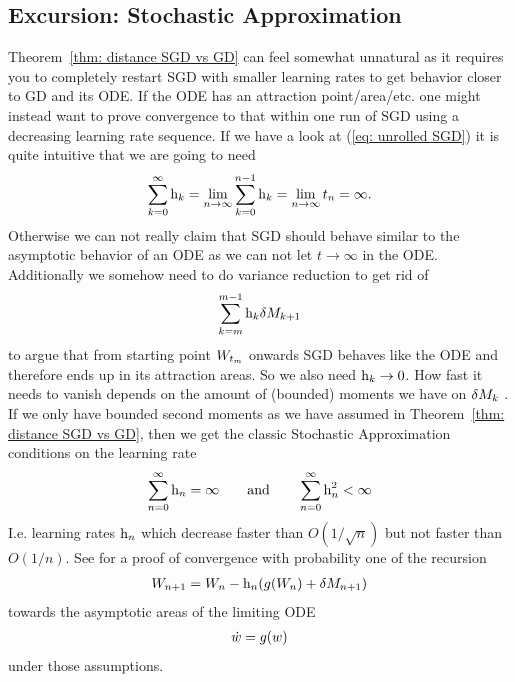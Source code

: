 \subsection{Excursion: Stochastic Approximation}

Theorem~\ref{thm: distance SGD vs GD} can feel somewhat unnatural as it requires
you to completely restart SGD with smaller learning rates to get behavior closer
to GD and its ODE. If the ODE has an attraction point/area/etc. one might
instead want to prove convergence to that within one run of SGD using a
decreasing learning rate sequence. If we have a look at (\ref{eq: unrolled SGD})
it is quite intuitive that we are going to need
\begin{align*}
	\sum_{k=0}^\infty \text{h}_k = \lim_{n\to\infty}\sum_{k=0}^{n-1} \text{h}_k
	= \lim_{n\to\infty}t_n = \infty.
\end{align*}
Otherwise we can not really claim that SGD should behave similar to the asymptotic
behavior of an ODE as we can not let \(t\to\infty\) in the ODE. Additionally
we somehow need to do variance reduction to get rid of
\begin{align*}
	\sum_{k=m}^{m-1} \text{h}_k\delta M_{k+1}
\end{align*}
to argue that from starting point \(W_{t_m}\) onwards SGD behaves like the ODE
and therefore ends up in its attraction areas. So we also need
\(\text{h}_k \to 0\). How fast it needs to vanish depends on the amount of (bounded)
moments we have on \(\delta M_k\) \parencite[p. 110]{kushnerStochasticApproximationAlgorithms1997}.
If we only have bounded second moments as we have assumed in Theorem~\ref{thm:
distance SGD vs GD}, then we get the classic Stochastic Approximation conditions
on the learning rate
\begin{align*}
	\sum_{n=0}^\infty \text{h}_n = \infty \qquad \text{and} \qquad \sum_{n=0}^\infty \text{h}_n^2 <\infty
\end{align*}
I.e. learning rates \(\text{h}_n\) which decrease faster than \(O(1/\sqrt{n})\) but
not faster than \(O(1/n)\). See \textcite[ch.
5]{kushnerStochasticApproximationAlgorithms1997} for a proof of
convergence with probability one of the recursion
\begin{align*}
	W_{n+1} = W_n - \text{h}_n(g(W_n) + \delta M_{n+1})
\end{align*}
towards the asymptotic areas of the limiting
ODE
\begin{align*}
	\dot{w} = g(w)
\end{align*}
under those assumptions.

